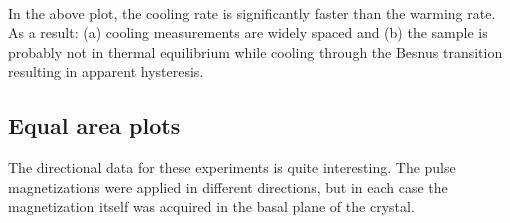 \documentclass{article}
\begin{document}
    \begin{center}
    \end{center}
    { \hspace*{\fill} \\}
    
    In the above plot, the cooling rate is significantly faster than the
warming rate. As a result: (a) cooling measurements are widely spaced
and (b) the sample is probably not in thermal equilibrium while cooling
through the Besnus transition resulting in apparent hysteresis.


    \subsection{Equal area plots}


    The directional data for these experiments is quite interesting. The
pulse magnetizations were applied in different directions, but in each
case the magnetization itself was acquired in the basal plane of the
crystal.
\end{document}
